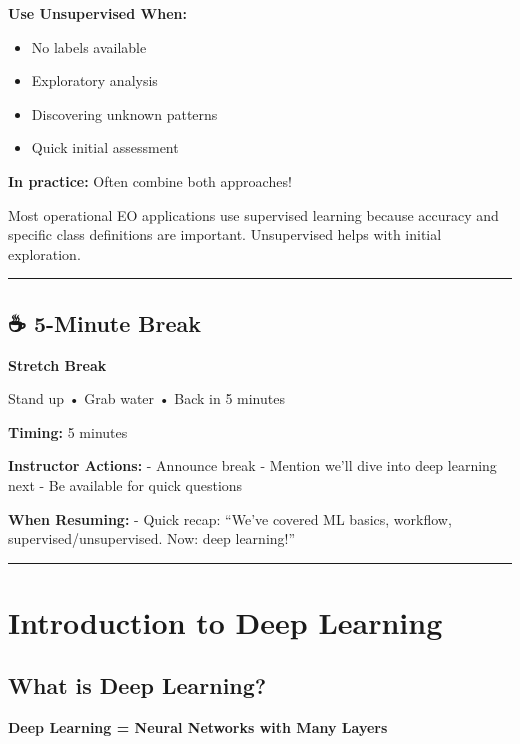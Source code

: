 \documentclass[
  letterpaper,
  DIV=11,
  numbers=noendperiod]{scrartcl}
\providecommand{\tightlist}{%
  \setlength{\itemsep}{0pt}\setlength{\parskip}{0pt}}
\begin{document}
\textbf{Use Unsupervised When:}

\begin{itemize}
\tightlist
\item
  No labels available
\item
  Exploratory analysis
\item
  Discovering unknown patterns
\item
  Quick initial assessment
\end{itemize}

\textbf{In practice:} Often combine both approaches!

Most operational EO applications use supervised learning because
accuracy and specific class definitions are important. Unsupervised
helps with initial exploration.

\begin{center}\rule{0.5\linewidth}{0.5pt}\end{center}

\subsection{☕ 5-Minute Break}\label{minute-break}

\textbf{Stretch Break}

Stand up • Grab water • Back in 5 minutes

\textbf{Timing:} 5 minutes

\textbf{Instructor Actions:} - Announce break - Mention we'll dive into
deep learning next - Be available for quick questions

\textbf{When Resuming:} - Quick recap: ``We've covered ML basics,
workflow, supervised/unsupervised. Now: deep learning!''

\begin{center}\rule{0.5\linewidth}{0.5pt}\end{center}

\section{Introduction to Deep
Learning}\label{introduction-to-deep-learning}

\subsection{What is Deep Learning?}\label{what-is-deep-learning}

\textbf{Deep Learning = Neural Networks with Many Layers}
\end{document}
